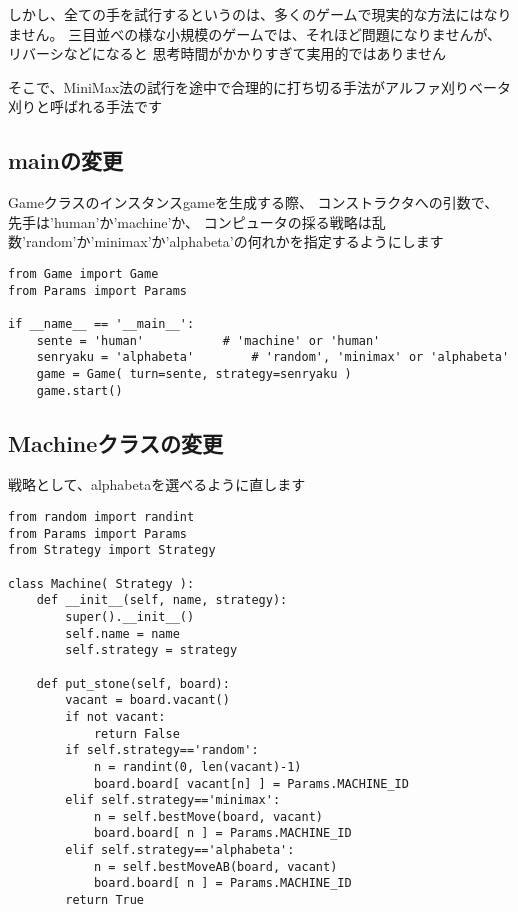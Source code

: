 \documentclass[uplatex,a4paper,11pt,oneside,openany]{jsbook}
\begin{document}
しかし、全ての手を試行するというのは、多くのゲームで現実的な方法にはなりません。
三目並べの様な小規模のゲームでは、それほど問題になりませんが、リバーシなどになると
思考時間がかかりすぎて実用的ではありません

そこで、MiniMax法の試行を途中で合理的に打ち切る手法がアルファ刈りベータ刈りと呼ばれる手法です

\subsection{mainの変更}

Gameクラスのインスタンスgameを生成する際、
コンストラクタへの引数で、先手は'human'か'machine'か、
コンピュータの採る戦略は乱数'random'か'minimax'か'alphabeta'の何れかを指定するようにします

\begin{lstlisting}[caption=main.py,label=minimax00]
from Game import Game
from Params import Params

if __name__ == '__main__':
    sente = 'human'           # 'machine' or 'human'
    senryaku = 'alphabeta'        # 'random', 'minimax' or 'alphabeta'
    game = Game( turn=sente, strategy=senryaku )
    game.start()
\end{lstlisting}

\subsection{Machineクラスの変更}

戦略として、alphabetaを選べるように直します

\begin{lstlisting}[caption=class Machine,label=minimax00]
from random import randint
from Params import Params
from Strategy import Strategy

class Machine( Strategy ):
    def __init__(self, name, strategy):
        super().__init__()
        self.name = name
        self.strategy = strategy

    def put_stone(self, board):
        vacant = board.vacant()
        if not vacant:
            return False
        if self.strategy=='random':
            n = randint(0, len(vacant)-1)
            board.board[ vacant[n] ] = Params.MACHINE_ID
        elif self.strategy=='minimax':
            n = self.bestMove(board, vacant)
            board.board[ n ] = Params.MACHINE_ID
        elif self.strategy=='alphabeta':
            n = self.bestMoveAB(board, vacant)
            board.board[ n ] = Params.MACHINE_ID
        return True
\end{lstlisting}
\end{document}
